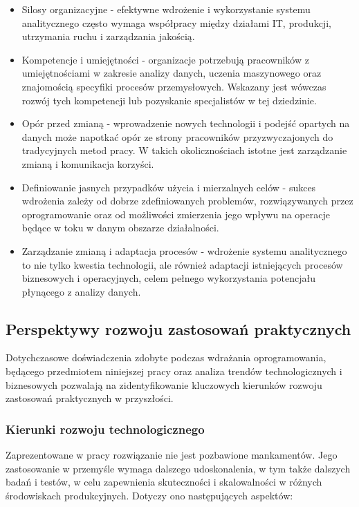 \begin{itemize}
    \item Silosy organizacyjne - efektywne wdrożenie i wykorzystanie systemu analitycznego często wymaga współpracy między działami IT, produkcji, utrzymania ruchu i zarządzania jakością.
    \item Kompetencje i umiejętności - organizacje potrzebują pracowników z umiejętnościami w zakresie analizy danych, uczenia maszynowego oraz znajomością specyfiki procesów przemysłowych. Wskazany jest wówczas rozwój tych kompetencji lub pozyskanie specjalistów w tej dziedzinie.
    \item Opór przed zmianą - wprowadzenie nowych technologii i podejść opartych na danych może napotkać opór ze strony pracowników przyzwyczajonych do tradycyjnych metod pracy. W takich okolicznościach istotne jest zarządzanie zmianą i komunikacja korzyści.
    \item Definiowanie jasnych przypadków użycia i mierzalnych celów - sukces wdrożenia zależy od dobrze zdefiniowanych problemów, rozwiązywanych przez oprogramowanie oraz od możliwości zmierzenia jego wpływu na operacje będące w toku w danym obszarze działalności.
    \newpage
    \item Zarządzanie zmianą i adaptacja procesów - wdrożenie systemu analitycznego to nie tylko kwestia technologii, ale również adaptacji istniejących procesów biznesowych i operacyjnych, celem pełnego wykorzystania potencjału płynącego z analizy danych.
\end{itemize}

\subsection{Perspektywy rozwoju zastosowań praktycznych}
\label{subsec:perspektywy_rozwoju}

Dotychczasowe doświadczenia zdobyte podczas wdrażania oprogramowania, będącego przedmiotem niniejszej pracy oraz analiza trendów technologicznych i biznesowych pozwalają na zidentyfikowanie kluczowych kierunków rozwoju zastosowań praktycznych w przyszłości.

\subsubsection{Kierunki rozwoju technologicznego}
\label{subsubsec:kierunki_rozwoju_tech}

Zaprezentowane w pracy rozwiązanie nie jest pozbawione mankamentów. Jego zastosowanie w przemyśle wymaga dalszego udoskonalenia, w tym także dalszych badań i testów, w celu zapewnienia skuteczności i skalowalności w różnych środowiskach produkcyjnych. Dotyczy ono następujących aspektów:

